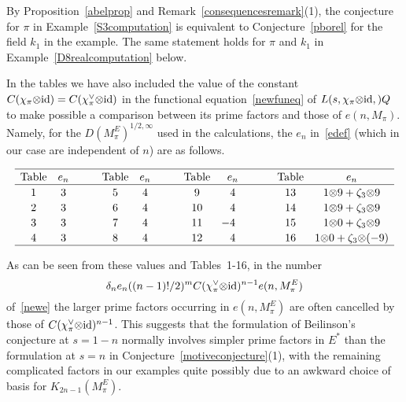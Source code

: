 \documentclass{amsart}
\begin{document}
\begin{remark}
By Proposition~\ref{abelprop} and Remark~\ref{consequencesremark}(1),
the conjecture for $ \pi $ in Example~\ref{S3computation} is equivalent to Conjecture~\ref{pborel}
for the field $ k_1 $ in the example.  The same statement holds for $ \pi $ and $ k_1 $ in
Example~\ref{D8realcomputation} below.
\end{remark}

\begin{remark}\label{constantremark}
In the tables we have also included the value of the  constant
$ C(\chi_\pi{\otimes}{\textup{id}}) = C(\chi_\pi^\vee{\otimes}{\textup{id}}) $
in the functional
equation~\eqref{newfuneq} of $ {L(s,{\chi_\pi{\otimes}{\textup{id}}},{\mathbb)}Q} $ to make possible a comparison between its
prime factors and those of $ e(n,M_\pi) $.
Namely, for the $ D(M_\pi^E)^{1/2,\infty} $ used in the calculations,
the $ e_n $ in~\eqref{edef} (which in our case
are independent of $ n $) are as follows.

\begin{center}
$$
\begin{array}{cc@{\qquad\quad}cc@{\qquad\quad}cc@{\qquad\quad}cc}
\hline
{\vphantom{p_{p_p}}\vphantom{b^{b^b}}}\hbox{Table} & e_n & \hbox{Table} & e_n &\hbox{Table} & e_n & \hbox{Table} & e_n \cr
\hline
{\vphantom{p_{p_p}}\vphantom{b^{b^b}}}
1 & 3 & 5 & 4 & 9 & 4 & 13 & 1{\otimes} 9 +{\zeta}_3{\otimes} 9
\cr
{\vphantom{p_{p_p}}\vphantom{b^{b^b}}}
2 & 3 & 6 & 4 & 10 & 4 & 14 & 1{\otimes} 9 +{\zeta}_3{\otimes} 9
\cr
{\vphantom{p_{p_p}}\vphantom{b^{b^b}}}
3 & 3 & 7 & 4 & 11 & \hbox to 20.8 pt{$-4$\hfill} & 15 & 1{\otimes} 0 +{\zeta}_3{\otimes} 9
\cr
{\vphantom{p_{p_p}}\vphantom{b^{b^b}}}
4 & 3 & 8 & 4 & 12 & 4 & 16 & 1{\otimes} 0 +{\zeta}_3{\otimes} (-9)
\cr
\hline
\end{array}
$$
\end{center}

\bigskip\noindent
As can be seen from these values and Tables~1-16, in the number
\begin{equation*}
\delta_n e_n ((n-1)!/2)^m C(\chi_\pi^\vee{\otimes}{\textup{id}})^{n-1} e(n,M_\pi^E) 
\end{equation*}
of~\eqref{newe} the larger prime factors occurring in $ e(n,M_\pi^E) $ are often
cancelled by those of $ C(\chi_\pi^\vee{\otimes}{\textup{id}})^{n-1} $.
This suggests that the formulation of Beilinson's
conjecture at $ s=1-n $ normally involves simpler prime factors in $ E^* $ than the formulation at $ s=n $
in Conjecture~\ref{motiveconjecture}(1), with the remaining complicated factors in our examples
quite possibly due to an awkward choice of basis for $ {{K_{2n-1}(M_\pi^E)}}$.
\end{remark}
\end{document}
